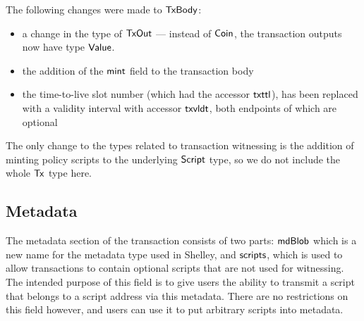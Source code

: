 The following changes were made to $\mathsf{TxBody}$:

\begin{itemize}
  \item a change in the type of $\mathsf{TxOut}$ --- instead of
$\mathsf{Coin}$, the transaction outputs now have type $\mathsf{Value}$.
  \item the addition of the $\mathsf{mint}$ field to the transaction body
  \item the time-to-live slot number (which had the accessor $\mathsf{txttl}$),
  has been replaced with a validity interval with accessor $\mathsf{txvldt}$,
  both endpoints of which are optional
\end{itemize}

The only change to the types related to transaction witnessing is the addition
of minting policy scripts to the underlying $\mathsf{Script}$ type, so we do not include the
whole $\mathsf{Tx}$ type here.

\subsection*{Metadata}

The metadata section of the transaction consists of two parts:
$\mathsf{mdBlob}$ which is a new name for the metadata type used in
Shelley, and $\mathsf{scripts}$, which is used to allow transactions to
contain optional scripts that are not used for witnessing. The
intended purpose of this field is to give users the ability to
transmit a script that belongs to a script address via this
metadata. There are no restrictions on this field however, and users
can use it to put arbitrary scripts into metadata.
